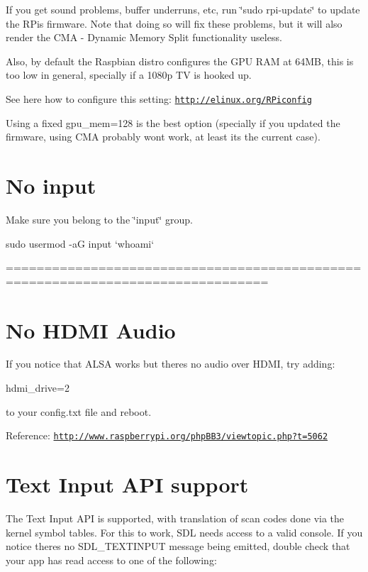 If you get sound problems, buffer underruns, etc, run \char`\"{}sudo rpi-\/update\char`\"{} to update the R\+Pi\textquotesingle{}s firmware. Note that doing so will fix these problems, but it will also render the C\+MA -\/ Dynamic Memory Split functionality useless.

Also, by default the Raspbian distro configures the G\+PU R\+AM at 64\+MB, this is too low in general, specially if a 1080p TV is hooked up.

See here how to configure this setting\+: \href{http://elinux.org/RPiconfig}{\tt http\+://elinux.\+org/\+R\+Piconfig}

Using a fixed gpu\+\_\+mem=128 is the best option (specially if you updated the firmware, using C\+MA probably won\textquotesingle{}t work, at least it\textquotesingle{}s the current case). 

 \section*{No input }

Make sure you belong to the \char`\"{}input\char`\"{} group. \begin{DoxyVerb}sudo usermod -aG input `whoami`
\end{DoxyVerb}


================================================================================ \section*{No H\+D\+MI Audio }

If you notice that A\+L\+SA works but there\textquotesingle{}s no audio over H\+D\+MI, try adding\+: \begin{DoxyVerb}hdmi_drive=2
\end{DoxyVerb}


to your config.\+txt file and reboot.

Reference\+: \href{http://www.raspberrypi.org/phpBB3/viewtopic.php?t=5062}{\tt http\+://www.\+raspberrypi.\+org/php\+B\+B3/viewtopic.\+php?t=5062} 

 \section*{Text Input A\+PI support }

The Text Input A\+PI is supported, with translation of scan codes done via the kernel symbol tables. For this to work, S\+DL needs access to a valid console. If you notice there\textquotesingle{}s no S\+D\+L\+\_\+\+T\+E\+X\+T\+I\+N\+P\+UT message being emitted, double check that your app has read access to one of the following\+:



